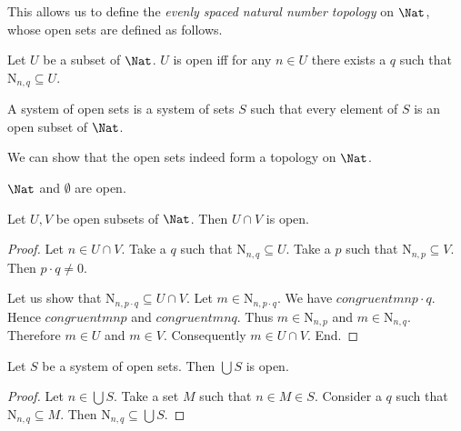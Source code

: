 \documentclass{stex}
\newcommand{\arithseq}[2]{\mathrm{N}_{#1,#2}}
\begin{document}
  This allows us to define the \textit{evenly spaced natural number
  topology} on $\Nat$, whose open sets are defined as follows.

  \begin{forthel}
    \begin{definition}
      Let $U$ be a subset of $\Nat$.
      $U$ is open iff for any $n \in U$ there exists a $q$ such that
      $\arithseq{n}{q} \subseteq U$.
    \end{definition}

    \begin{definition}
      A system of open sets is a system of sets $S$ such that every element of
      $S$ is an open subset of $\Nat$.
    \end{definition}
  \end{forthel}

  We can show that the open sets indeed form a topology on $\Nat$.

  \begin{forthel}
    \begin{lemma}
      $\Nat$ and $\emptyset$ are open.
    \end{lemma}

    \begin{lemma}
      Let $U,V$ be open subsets of $\Nat$.
      Then $U \cap V$ is open.
    \end{lemma}
    \begin{proof}
      Let $n \in U \cap V$.
      Take a $q$ such that $\arithseq{n}{q} \subseteq U$.
      Take a $p$ such that $\arithseq{n}{p} \subseteq V$.
      Then $p \cdot q \neq 0$.

      Let us show that $\arithseq{n}{p \cdot q} \subseteq U \cap V$.
        Let $m \in \arithseq{n}{p \cdot q}$.
        We have $congruent{m}{n}{p \cdot q}$.
        Hence $congruent{m}{n}{p}$ and $congruent{m}{n}{q}$.
        Thus $m \in \arithseq{n}{p}$ and $m \in \arithseq{n}{q}$.
        Therefore $m \in U$ and $m \in V$.
        Consequently $m \in U \cap V$.
      End.
    \end{proof}

    \begin{lemma}
      Let $S$ be a system of open sets.
      Then $\bigcup S$ is open.
    \end{lemma}
    \begin{proof}
      Let $n \in \bigcup S$.
      Take a set $M$ such that $n \in M \in S$.
      Consider a $q$ such that $\arithseq{n}{q} \subseteq M$.
      Then $\arithseq{n}{q} \subseteq \bigcup S$.
    \end{proof}
  \end{forthel}
\end{document}

